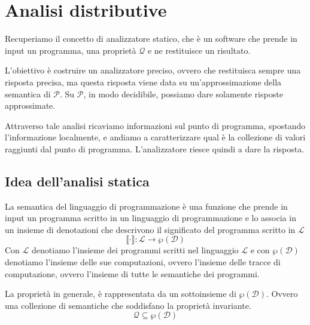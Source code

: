 \chapter{Analisi distributive}
Recuperiamo il concetto di analizzatore statico, che è un software che prende
in input un programma, una proprietà $\mathcal{Q}$ e ne restituisce un risultato.

\begin{figure}[H]
    \centering
\end{figure}
L'obiettivo è costruire un analizzatore preciso, ovvero che restituisca sempre
una risposta precisa, ma questa risposta viene data su un'approssimazione della semantica di $\mathcal{P}$.
Su $\mathcal{P}$, in modo decidibile, possiamo dare solamente risposte approssimate.

Attraverso tale analisi ricaviamo informazioni sul punto di programma, spostando l'informazione 
localmente, e andiamo a caratterizzare qual è la collezione di valori raggiunti dal punto di programma. 
L'analizzatore riesce quindi a dare la risposta.

\section{Idea dell'analisi statica}
La semantica del linguaggio di programmazione è una funzione che prende in input un programma scritto in un linguaggio
di programmazione e lo associa in un insieme di denotazioni che descrivono il significato del programma
scritto in $\mathcal{L}$
\[
  \llbracket \cdot \rrbracket : \mathcal{L} \rightarrow \wp(\mathcal{D})
\]
Con $\mathcal{L}$ denotiamo l'insieme dei programmi scritti nel linguaggio $\mathcal{L}$ e con 
$\wp(\mathcal{D})$ denotiamo l'insieme delle sue computazioni, ovvero l'insieme delle tracce di computazione,
ovvero l'insieme di tutte le semantiche dei programmi.

La proprietà in generale, è rappresentata da un sottoinsieme di $\wp(\mathcal{D})$. Ovvero una collezione 
di semantiche che soddisfano la proprietà invariante.
\[
    \mathcal{Q} \subseteq \wp(\mathcal{D})
\]

